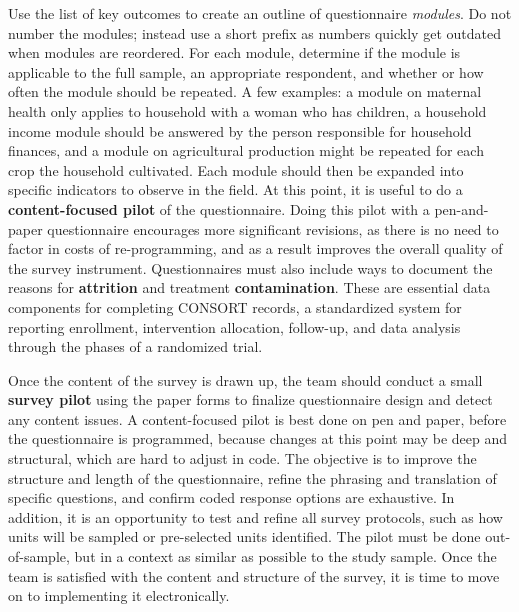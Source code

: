 Use the list of key outcomes to create an outline of questionnaire \textit{modules}.
Do not number the modules; instead use a short prefix 
as numbers quickly get outdated when modules are reordered.
For each module, determine if the module is applicable to the full sample,
an appropriate respondent, and whether or how often the module should be repeated.
A few examples: a module on maternal health only applies to household with a woman who has children,
a household income module should be answered by the person responsible for household finances,
and a module on agricultural production might be repeated for each crop the household cultivated.
Each module should then be expanded into specific indicators to observe in the field.
At this point, it is useful to do a  \textbf{content-focused pilot}
of the questionnaire.
Doing this pilot with a pen-and-paper questionnaire encourages more significant revisions,
as there is no need to factor in costs of re-programming,
and as a result improves the overall quality of the survey instrument.
Questionnaires must also include ways to document the reasons for \textbf{attrition} and
treatment \textbf{contamination}.
These are essential data components for completing CONSORT records,
a standardized system for reporting enrollment, intervention allocation, follow-up,
and data analysis through the phases of a randomized trial.\cite{begg1996improving}

Once the content of the survey is drawn up,
the team should conduct a small \textbf{survey pilot}
using the paper forms to finalize questionnaire design and detect any content issues.
A content-focused pilot
is best done on pen and paper, before the questionnaire is programmed,
because changes at this point may be deep and structural, which are hard to adjust in code.
The objective is to improve the structure and length of the questionnaire,
refine the phrasing and translation of specific questions,
and confirm coded response options are exhaustive.
In addition, it is an opportunity to test and refine all survey protocols,
such as how units will be sampled or pre-selected units identified.
The pilot must be done out-of-sample,
but in a context as similar as possible to the study sample.
Once the team is satisfied with the content and structure of the survey,
it is time to move on to implementing it electronically.


